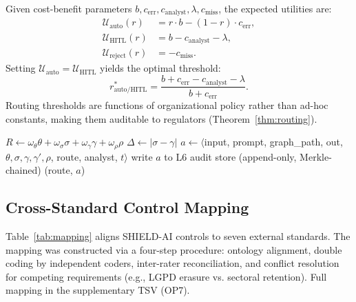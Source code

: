 \documentclass[journal]{IEEEtran}
\begin{document}
Given cost-benefit parameters $b, c_{\text{err}}, c_{\text{analyst}}, \lambda, c_{\text{miss}}$,
the expected utilities are:
\begin{align}
\mathcal{U}_{\text{auto}}(r) &= r \cdot b - (1-r) \cdot c_{\text{err}}, \\
\mathcal{U}_{\text{HITL}}(r) &= b - c_{\text{analyst}} - \lambda, \\
\mathcal{U}_{\text{reject}}(r) &= -c_{\text{miss}}.
\end{align}
Setting $\mathcal{U}_{\text{auto}} = \mathcal{U}_{\text{HITL}}$ yields the optimal threshold:
\begin{equation}
r^*_{\text{auto/HITL}} = \frac{b + c_{\text{err}} - c_{\text{analyst}} - \lambda}{b + c_{\text{err}}}.
\label{eq:threshold}
\end{equation}
Routing thresholds are functions of organizational policy rather than ad-hoc constants,
making them auditable to regulators (Theorem~\ref{thm:routing}).

\begin{algorithm}[!t]
\caption{PC3 -- Human Validation and Hallucination Control}
\label{alg:pc3}
\SetAlgoLined
\DontPrintSemicolon
{}
$R \gets \omega_\theta\theta + \omega_\sigma\sigma + \omega_\gamma\gamma + \omega_\rho\rho$\;
$\Delta \gets |\sigma - \gamma|$\;
$a \gets \langle$input, prompt, graph\_path, out, $\theta,\sigma,\gamma,\gamma',\rho$, route, analyst, $t\rangle$\;
write $a$ to L6 audit store (append-only, Merkle-chained)\;
\Return (route, $a$)
\end{algorithm}

\subsection{Cross-Standard Control Mapping}
\label{ssec:mapping}

Table~\ref{tab:mapping} aligns SHIELD-AI controls to seven external standards. The mapping
was constructed via a four-step procedure: ontology alignment, double coding by independent
coders, inter-rater reconciliation, and conflict resolution for competing requirements
(e.g., LGPD erasure vs. sectoral retention). Full mapping in the supplementary TSV (OP7).
\end{document}
